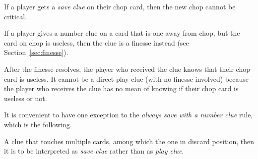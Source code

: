 \begin{corollary}
	If a player gets a \emph{save clue} on their chop card, then the new chop cannot be critical.
\end{corollary}

\begin{corollary}
	\label{fake-early-save}
	If a player gives a number clue on a card that is one away from chop, but the card on chop is useless, then the clue is a finesse instead (see Section~\ref{sec:finesse}).
\end{corollary}

After the finesse resolves, the player who received the clue knows that their chop card is useless. It cannot be a direct play clue (with no finesse involved) because the player who receives the clue has no mean of knowing if their chop card is useless or not.

It is convenient to have one exception to the \emph{always save with a number clue} rule, which is the following.

\begin{convention}
	A  clue that touches multiple cards, among which the one in discard position, then it is to be interpreted as \emph{save clue} rather than as \emph{play clue}.
\end{convention}

